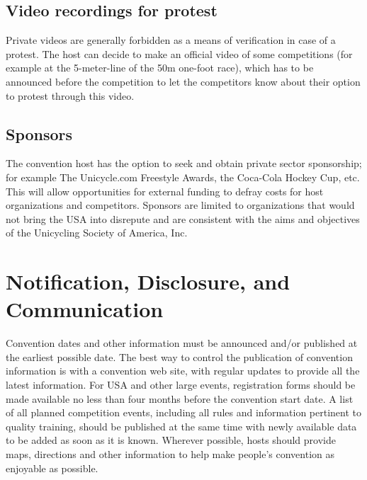 \subsection{Video recordings for protest}
Private videos are generally forbidden as a means of verification in case of a protest. 
The host can decide to make an official video of some competitions (for example at the 5-meter-line of the 50m one-foot race), which has to be announced before the competition to let the competitors know about their option to protest through this video.

\subsection{Sponsors}
The convention host has the option to seek and obtain private sector sponsorship; for example The Unicycle.com Freestyle Awards, the Coca-Cola Hockey Cup, etc. 
This will allow opportunities for external funding to defray costs for host organizations and competitors. 
Sponsors are limited to organizations that would not bring the USA into disrepute and are consistent with the aims and objectives of the Unicycling Society of America, Inc.

\section{Notification, Disclosure, and Communication}
Convention dates and other information must be announced and/or published at the earliest possible date. 
The best way to control the publication of convention information is with a convention web site, with regular updates to provide all the latest information. 
For USA and other large events, registration forms should be made available no less than four months before the convention start date. 
A list of all planned competition events, including all rules and information pertinent to quality training, should be published at the same time with newly available data to be added as soon as it is known.
Wherever possible, hosts should provide maps, directions and other information to help make people's convention as enjoyable as possible.

